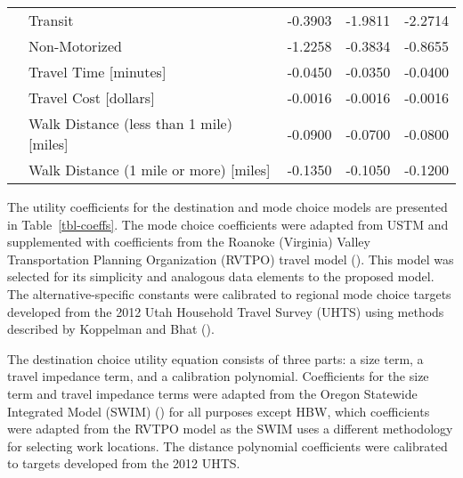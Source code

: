 \documentclass[]{ascelike-new}
\begin{document}
\begin{table}
{\begin{tabular}[t]{llrrr}
\hspace{1em} & Transit & -0.3903 & -1.9811 & -2.2714\\

\hspace{1em} & Non-Motorized & -1.2258 & -0.3834 & -0.8655\\

\hspace{1em} & Travel Time [minutes] & -0.0450 & -0.0350 & -0.0400\\

\hspace{1em} & Travel Cost [dollars] & -0.0016 & -0.0016 & -0.0016\\

\hspace{1em} & Walk Distance (less than 1 mile) [miles] & -0.0900 & -0.0700 & -0.0800\\

\hspace{1em} & Walk Distance (1 mile or more) [miles] & -0.1350 & -0.1050 & -0.1200\\
\bottomrule
\end{tabular}

}

\end{table}%

The utility coefficients for the destination and mode choice models are
presented in Table~\ref{tbl-coeffs}. The mode choice coefficients were
adapted from USTM and supplemented with coefficients from the Roanoke
(Virginia) Valley Transportation Planning Organization (RVTPO) travel
model (). This model was selected for its simplicity and analogous data
elements to the proposed model. The alternative-specific constants were
calibrated to regional mode choice targets developed from the 2012 Utah
Household Travel Survey (UHTS) using methods described by Koppelman and
Bhat ().

The destination choice utility equation consists of three parts: a size
term, a travel impedance term, and a calibration polynomial.
Coefficients for the size term and travel impedance terms were adapted
from the Oregon Statewide Integrated Model (SWIM)
() for all purposes except
HBW, which coefficients were adapted from the RVTPO model as the SWIM
uses a different methodology for selecting work locations. The distance
polynomial coefficients were calibrated to targets developed from the
2012 UHTS.
\end{document}
